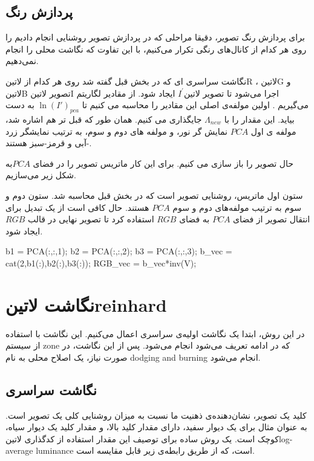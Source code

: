  
\subsection{پردازش رنگ}
برای پردازش رنگ تصویر، دقیقا مراحلی که در پردازش تصویر روشنایی انجام دادیم را روی هر کدام از کانال‌های رنگی تکرار می‌کنیم، با این تفاوت که نگاشت محلی را انجام نمی‌دهیم.

نگاشت سراسری ای که در بخش قبل گفته شد روی هر کدام از 
 ‌لاتین{R }،
  ‌لاتین{G } و 
   ‌لاتین{B }
 تصویر 
    ‌لاتین{I }
  اجرا می‌شود تا تصویر 
     ‌لاتین{$I^{'}$ }
  ایجاد شود.
  از مقادیر لگاریتم می‌گیریم . اولین مولفه‌ی اصلی این مقادیر را محاسبه می کنیم تا 
$\ln(I')_{pca}$              
    به دست بیاید. این مقدار را با
$\Lambda_{new}$
   جایگذاری می کنیم. همان طور که قبل تر هم اشاره شد، مولفه ی اول $PCA$ نمایش گر نور، و مولفه های دوم و سوم، به ترتیب نمایشگر زرد -آبی  و قرمز-سبز هستند.
   
   حال تصویر را باز سازی می کنیم. 
   برای این کار  ماتریس تصویر را در فضای $PCA$به شکل زیر می‌سازیم.
   
   ستون اول ماتریس، روشنایی تصویر است که در بخش قبل محاسبه شد. ستون دوم و سوم به ترتیب مولفه‌های دوم و سوم $PCA$ هستند. حال کافی است از یک تبدیل برای انتقال تصویر از فضای $PCA$ به فضای $RGB$ استفاده کرد تا تصویر نهایی در قالب $RGB$ ایجاد شود.
   
    
    \begin{code}
    	\begin{matlab}
    		 b1 = PCA(:,:,1);
    		 b2 = PCA(:,:,2);
    		 b3 = PCA(:,:,3);
    		 b_vec = cat(2,b1(:),b2(:),b3(:));	 
    		 RGB_vec = b_vec*inv(V);
    	\end{matlab}
    \end{code}
    
  
  

\section{نگاشت 
	‌لاتین{reinhard }
}

در این روش، ابتدا یک نگاشت اولیه‌ی سراسری اعمال می‌کنیم. این نگاشت با استفاده از سیستم zone که در ادامه تعریف می‌شود انجام می‌شود. پس از این نگاشت، در صورت نیاز، یک اصلاح محلی به نام  dodging and burning انجام می‌شود.


\subsection{نگاشت سراسری}
کلید یک تصویر، نشان‌دهنده‌ی ذهنیت ما نسبت به میزان روشنایی کلی یک تصویر است. به عنوان مثال برای یک دیوار سفید، دارای مقدار کلید بالا، و مقدار کلید یک دیوار سیاه، کوچک است.
یک روش ساده برای توصیف این مقدار استفاده از کدگذاری
‌لاتین{log-average luminance }
است، که از طریق رابطه‌ی زیر قابل مقایسه است.

